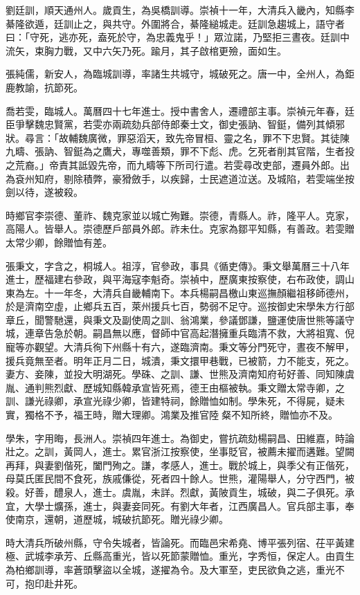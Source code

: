 \begin{pinyinscope}
劉廷訓，順天通州人。歲貢生，為吳橋訓導。崇禎十一年，大清兵入畿內，知縣李綦隆欲遁，廷訓止之，與共守。外圍將合，綦隆縋城走。廷訓急趨城上，語守者曰：「守死，逃亦死，盍死於守，為忠義鬼乎！」眾泣諾，乃堅拒三晝夜。廷訓中流矢，束胸力戰，又中六矢乃死。踰月，其子啟棺更殮，面如生。

張純儒，新安人，為臨城訓導，率諸生共城守，城破死之。唐一中，全州人，為鉅鹿教諭，抗節死。

喬若雯，臨城人。萬曆四十七年進士。授中書舍人，遷禮部主事。崇禎元年春，廷臣爭擊魏忠賢黨，若雯亦兩疏劾兵部侍郎秦士文，御史張訥、智鋌，備列其傾邪狀。尋言：「故輔魏廣微，罪惡滔天，致先帝冒桓、靈之名，罪不下忠賢。其徒陳九疇、張訥、智鋌為之鷹犬，專噬善類，罪不下彪、虎。乞死者削其官階，生者投之荒裔。」帝責其詆毀先帝，而九疇等下所司行遣。若雯尋改吏部，遷員外郎。出為袞州知府，剔除積弊，豪猾斂手，以疾歸，士民遮道泣送。及城陷，若雯端坐按劍以待，遂被殺。

時鄉官李崇德、董祚、魏克家並以城亡殉難。崇德，青縣人。祚，隆平人。克家，高陽人。皆舉人。崇德歷戶部員外郎。祚未仕。克家為鄒平知縣，有善政。若雯贈太常少卿，餘贈恤有差。

張秉文，字含之，桐城人。祖淳，官參政，事具《循吏傳》。秉文舉萬曆三十八年進士，歷福建右參政，與平海寇李魁奇。崇禎中，歷廣東按察使，右布政使，調山東為左。十一年冬，大清兵自畿輔南下。本兵楊嗣昌檄山東巡撫顏繼祖移師德州，於是濟南空虛，止鄉兵五百，萊州援兵七百，勢弱不足守。巡按御史宋學朱方行部章丘，聞警馳還，與秉文及副使周之訓、翁鴻業，參議鄧謙，鹽運使唐世熊等議守城，連章告急於朝。嗣昌無以應，督師中官高起潛擁重兵臨清不救，大將祖寬、倪寵等亦觀望。大清兵徇下州縣十有六，遂臨濟南。秉文等分門死守，晝夜不解甲，援兵竟無至者。明年正月二日，城潰，秉文擐甲巷戰，已被箭，力不能支，死之。妻方、妾陳，並投大明湖死。學硃、之訓、謙、世熊及濟南知府茍好善、同知陳虞胤、通判熊烈獻、歷城知縣韓承宣皆死焉，德王由樞被執。秉文贈太常寺卿，之訓、謙光祿卿，承宣光祿少卿，皆建特祠，餘贈恤如制。學朱死，不得屍，疑未實，獨格不予，福王時，贈大理卿。鴻業及推官陸粲不知所終，贈恤亦不及。

學朱，字用晦，長洲人。崇禎四年進士。為御史，嘗抗疏劾楊嗣昌、田維嘉，時論壯之。之訓，黃岡人，進士。累官浙江按察使，坐事貶官，被薦未擢而遘難。望闕再拜，與妻劉偕死，闔門殉之。謙，孝感人，進士。戰於城上，與季父有正偕死，母莫氏匿民間不食死，族戚傔從，死者四十餘人。世熊，灌陽舉人，分守西門，被殺。好善，醴泉人，進士。虞胤，未詳。烈獻，黃陂貢生，城破，與二子俱死。承宜，大學士爌孫，進士，與妻妾同死。有劉大年者，江西廣昌人。官兵部主事，奉使南京，還朝，道歷城，城破抗節死。贈光祿少卿。

時大清兵所破州縣，守令失城者，皆論死。而臨邑宋希堯、博平張列宿、茌平黃建極、武城李承芳、丘縣高重光，皆以死節蒙贈恤。重光，字秀恒，保定人。由貢生為柏鄉訓導，率蒼頭擊盜以全城，遂擢為令。及大軍至，吏民欲負之逃，重光不可，抱印赴井死。


\end{pinyinscope}
